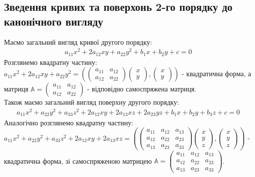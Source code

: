 \subsection{Зведення кривих та поверхонь 2-го порядку до канонічного вигляду}
Маємо загальний вигляд кривої другого порядку:
\begin{align*}
a_{11}x^2 + 2a_{12}xy + a_{22}y^2 + b_1x + b_2y + c = 0
\end{align*}
Розглянемо квадратну частину:\\
$a_{11}x^2 + 2a_{12}xy + a_{22}y^2 = \left( \begin{pmatrix}
 a_{11} & a_{12} \\
 a_{12} & a_{22}
\end{pmatrix} \begin{pmatrix}
x \\ y
\end{pmatrix}, \begin{pmatrix}
x \\ y
\end{pmatrix} \right)$ - квадратична форма, а матриця $\mathbb{A} = \begin{pmatrix}
a_{11} & a_{12} \\
a_{12} & a_{22}
\end{pmatrix}$ - відповідно самоспряжена матриця.
\bigskip \\
Також маємо загальний вигляд поверхну другого порядку:
\begin{align*}
a_{11}x^2 + a_{22}y^2 + a_{33}z^2 + 2a_{12}xy + 2a_{13}xz + 2a_{23}yz + b_1x + b_2y + b_3z + c = 0
\end{align*}
Аналогічно розглянемо квадратну частину:\\
$a_{11}x^2 + a_{22}y^2 + a_{33}z^2 + 2a_{12}xy + 2a_{13}xz = \left(\begin{pmatrix}
a_{11} & a_{12} & a_{13} \\
a_{12} & a_{22} & a_{23} \\
a_{13} & a_{23} & a_{33}
\end{pmatrix} \begin{pmatrix}
x \\ y \\ z
\end{pmatrix}, \begin{pmatrix}
x \\ y \\ z
\end{pmatrix} \right)$ - квадратична форма, зі самоспряженою матрицею $\mathbb{A} = \begin{pmatrix}
a_{11} & a_{12} & a_{13} \\
a_{12} & a_{22} & a_{23} \\
a_{13} & a_{23} & a_{33}
\end{pmatrix}$.
